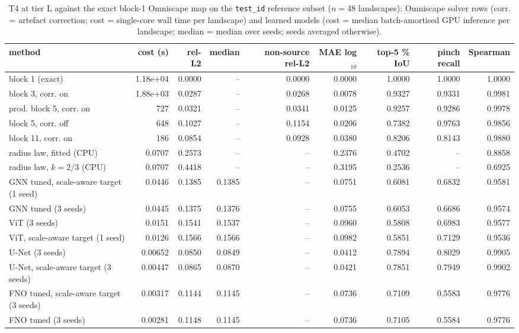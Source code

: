\begin{table}[tb]
\centering
\scriptsize
\setlength{\tabcolsep}{3.5pt}
\caption{T4 at tier L against the exact block-1 Omniscape map on the \texttt{test\_id} reference subset ($n = 48$ landscapes): Omniscape solver rows (corr. = artefact correction; cost = single-core wall time per landscape) and learned models (cost = median batch-amortised GPU inference per landscape; median = median over seeds; seeds averaged otherwise).}
\label{tab:pareto_L}
\setlength{\tabcolsep}{2.2pt}
\begin{tabular}{lrrrrrrrr}
\toprule
method & cost (s) & rel-L2 & median & non-source rel-L2 & MAE log$_{10}$ & top-5 \% IoU & pinch recall & Spearman \\
\midrule
block 1 (exact) & 1.18e+04 & 0.0000 & -- & 0.0000 & 0.0000 & 1.0000 & 1.0000 & 1.0000 \\
block 3, corr. on & 1.88e+03 & 0.0287 & -- & 0.0268 & 0.0078 & 0.9327 & 0.9331 & 0.9981 \\
prod. block 5, corr. on & 727 & 0.0321 & -- & 0.0341 & 0.0125 & 0.9257 & 0.9286 & 0.9978 \\
block 5, corr. off & 648 & 0.1027 & -- & 0.1154 & 0.0206 & 0.7382 & 0.9763 & 0.9856 \\
block 11, corr. on & 186 & 0.0854 & -- & 0.0928 & 0.0380 & 0.8206 & 0.8143 & 0.9880 \\
radius law, fitted (CPU) & 0.0707 & 0.2573 & -- & -- & 0.2376 & 0.4702 & -- & 0.8858 \\
radius law, $k=2/3$ (CPU) & 0.0707 & 0.4418 & -- & -- & 0.3195 & 0.2536 & -- & 0.6925 \\
GNN tuned, scale-aware target (1 seed) & 0.0446 & 0.1385 & 0.1385 & -- & 0.0751 & 0.6081 & 0.6832 & 0.9581 \\
GNN tuned (3 seeds) & 0.0445 & 0.1375 & 0.1376 & -- & 0.0755 & 0.6053 & 0.6686 & 0.9574 \\
ViT (3 seeds) & 0.0151 & 0.1541 & 0.1537 & -- & 0.0960 & 0.5808 & 0.6983 & 0.9577 \\
ViT, scale-aware target (1 seed) & 0.0126 & 0.1566 & 0.1566 & -- & 0.0982 & 0.5851 & 0.7129 & 0.9536 \\
U-Net (3 seeds) & 0.00652 & 0.0850 & 0.0849 & -- & 0.0412 & 0.7894 & 0.8029 & 0.9905 \\
U-Net, scale-aware target (3 seeds) & 0.00447 & 0.0865 & 0.0870 & -- & 0.0421 & 0.7851 & 0.7949 & 0.9902 \\
FNO tuned, scale-aware target (3 seeds) & 0.00317 & 0.1144 & 0.1145 & -- & 0.0736 & 0.7109 & 0.5583 & 0.9776 \\
FNO tuned (3 seeds) & 0.00281 & 0.1148 & 0.1145 & -- & 0.0736 & 0.7105 & 0.5584 & 0.9776 \\
\bottomrule
\end{tabular}
\end{table}
